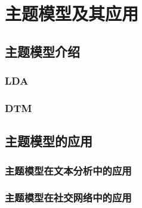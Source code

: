 \chapter{主题模型及其应用}
\section{主题模型介绍}

\subsection{LDA}
\subsection{DTM}

\section{主题模型的应用}

\subsection{主题模型在文本分析中的应用}
\subsection{主题模型在社交网络中的应用}